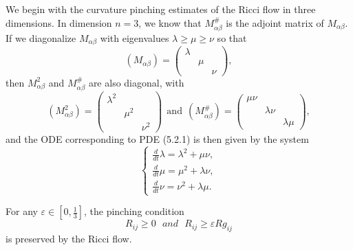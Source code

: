 We begin with the curvature pinching estimates of the Ricci flow
in three dimensions. In dimension $n=3$, we know that
$M_{\alpha\beta}^\#$ is the adjoint matrix of $M_{\alpha\beta}$.
If we diagonalize $M_{\alpha\beta}$ with eigenvalues $\lambda \ge
\mu \ge \nu$ so that
$$
(M_{\alpha\beta})=\left(
\begin{array}{ccc}\lambda&  \ &  \ \\
\ &  \mu &  \ \\
\ &  \ &  \nu
\end{array}
\right),
$$
then $M_{\alpha\beta}^2$ and $M_{\alpha\beta}^\#$ are also
diagonal, with
$$
(M_{\alpha\beta}^2)=\left(
\begin{array}{ccc}\lambda^2&  \ &  \ \\
\ &  \mu^2 &  \ \\
\ &  \ &  \nu^2
\end{array}
\right) \ \ \text{and} \ \ (M_{\alpha\beta}^\#)=\left(
\begin{array}{ccc}\mu\nu&  \ &  \ \\
\ &  \lambda\nu &  \ \\
\ &  \ &  \lambda\mu
\end{array}
\right),
$$
and the ODE corresponding to PDE (5.2.1) is then given by the
system \begin{equation}
      \left\{
       \begin{array}{lll}
  \frac{d}{dt}\lambda=\lambda^2+\mu\nu,\\[4mm]
  \frac{d}{dt}\mu=\mu^2+\lambda\nu,\\[4mm]
  \frac{d}{dt}\nu=\nu^2+\lambda\mu.
       \end{array}
    \right.
\end{equation}

\begin{lemma} 
  \label{lem:cz-three-dimensional-ricci-pinching-preserved}

For any $\varepsilon\in[0,\frac{1}{3}]$, the pinching condition
$$
R_{ij}\geq0\ \ \ and\ \ \ R_{ij}\geq\varepsilon Rg_{ij}
$$
is preserved by the Ricci flow.
\end{lemma}

